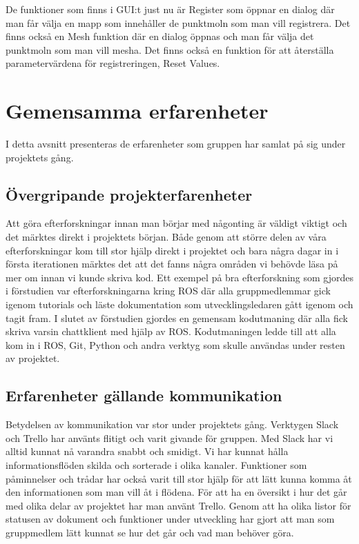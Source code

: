 De funktioner som finns i GUI:t just nu är Register som öppnar en dialog där man får välja en mapp som innehåller de punktmoln som man vill registrera. Det finns också en Mesh funktion där en dialog öppnas och man får välja det punktmoln som man vill mesha. Det finns också en funktion för att återställa parametervärdena för registreringen, Reset Values.

\section{Gemensamma erfarenheter}

I detta avsnitt presenteras de erfarenheter som gruppen har samlat på sig under projektets gång.

\subsection{Övergripande projekterfarenheter}

Att göra efterforskningar innan man börjar med någonting är väldigt viktigt och det märktes direkt i projektets början. Både genom att större delen av våra efterforskningar kom till stor hjälp direkt i projektet och bara några dagar in i första iterationen märktes det att det fanns några områden vi behövde läsa på mer om innan vi kunde skriva kod. Ett exempel på bra efterforskning som gjordes i förstudien var efterforskningarna kring ROS där alla gruppmedlemmar gick igenom tutorials och läste dokumentation som utvecklingsledaren gått igenom och tagit fram. I slutet av förstudien gjordes en gemensam kodutmaning där alla fick skriva varsin chattklient med hjälp av ROS. Kodutmaningen ledde till att alla kom in i ROS, Git, Python och andra verktyg som skulle användas under resten av projektet.


\subsection{Erfarenheter gällande kommunikation}

Betydelsen av kommunikation var stor under projektets gång. Verktygen Slack och Trello har använts flitigt och varit givande för gruppen. Med Slack har vi alltid kunnat nå varandra snabbt och smidigt. Vi har kunnat hålla informationsflöden skilda och sorterade i olika kanaler. Funktioner som påminnelser och trådar har också varit till stor hjälp för att lätt kunna komma åt den informationen som man vill åt i flödena. För att ha en översikt i hur det går med olika delar av projektet har man använt Trello. Genom att ha olika listor för statusen av dokument och funktioner under utveckling har gjort att man som gruppmedlem lätt kunnat se hur det går och vad man behöver göra. 


